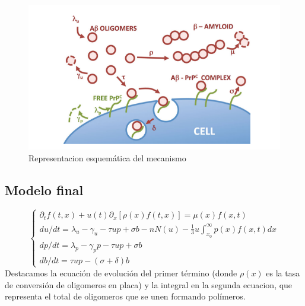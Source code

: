 \documentclass[1p]{elsarticle}
\begin{document}
	\begin{figure}
		\begin{center}
		\includegraphics[scale=0.5]{segunda1.png}
		\caption{Representacion esquemática del mecanismo}
		\label{cerebro5}
			\end{center}
	\end{figure}

\subsection{Modelo final}

\begin{equation}
\left\lbrace
\begin{array}{ll}
\partial_tf(t,x)+u(t)\partial_x[\rho(x)f(t,x)]=\mu(x)f(x,t) \\
du/dt=\lambda_u-\gamma_u-\tau u p+\sigma b-nN(u)-\frac{1}{3}u\int_{x_0}^{\infty}p(x)f(x,t)dx\\
dp/dt=\lambda_p-\gamma_pp-\tau u p+\sigma b  \\
db/dt=\tau u p-(\sigma+\delta)b
\end{array}
\right.
\end{equation}
Destacamos la ecuación de evolución del primer término (donde $\rho(x)$ es la tasa de conversión de oligomeros en placa) y la integral en la segunda ecuacion, que representa el total de oligomeros que se unen formando polímeros.
\end{document}
